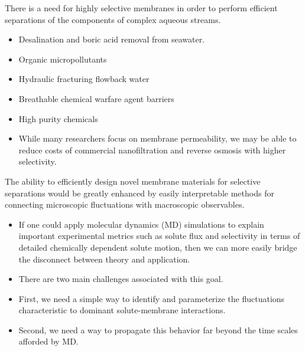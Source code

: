 \documentclass[journal=jpcbfk,manuscript=article]{achemso}
\begin{document}
  There is a need for highly selective membranes in order to perform efficient 
  separations of the components of complex aqueous streams.
  \begin{itemize}
    \item Desalination and boric acid removal from seawater.
    \item Organic micropollutants
    \item Hydraulic fracturing flowback water
    \item Breathable chemical warfare agent barriers
    \item High purity chemicals
    \item While many researchers focus on membrane permeability, we may be 
    able to reduce costs of commercial nanofiltration and reverse osmosis with
    higher selectivity.~\cite{werber_materials_2016}
  \end{itemize}
  
  The ability to efficiently design novel membrane materials for selective separations would be 
  greatly enhanced by easily interpretable methods for connecting microscopic fluctuations
  with macroscopic observables.
  \begin{itemize}
  	\item If one could apply molecular dynamics (MD) simulations to explain important
  	experimental metrics such as solute flux and selectivity in terms of detailed 
  	chemically dependent solute motion, then we can more easily bridge the disconnect
  	between theory and application.
  	\item There are two main challenges associated with this goal.
  	\item First, we need a simple way to identify and parameterize the fluctuations
  	characteristic to dominant solute-membrane interactions.
  	\item Second, we need a way to propagate this behavior far beyond the time scales
  	afforded by MD.
  \end{itemize}
  
\end{document}
